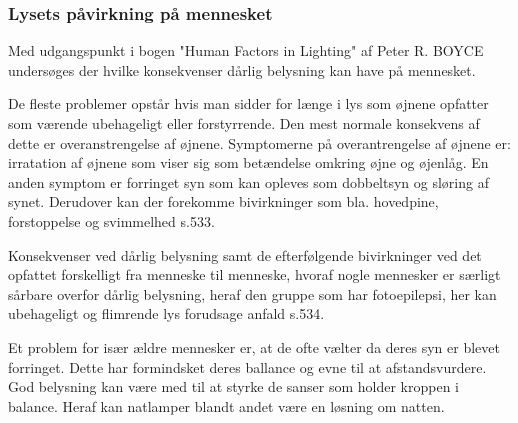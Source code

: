 \subsubsection{Lysets påvirkning på mennesket} 
\label{sec:konsekvenser}

Med udgangspunkt i bogen "Human Factors in Lighting" af Peter R. BOYCE undersøges der hvilke konsekvenser dårlig belysning kan have på mennesket. 

De fleste problemer opstår hvis man sidder for længe i lys som øjnene opfatter som værende ubehageligt eller forstyrrende. Den mest normale konsekvens af dette er overanstrengelse af øjnene. Symptomerne på overantrengelse af øjnene er: irratation af øjnene som viser sig som betændelse omkring øjne og øjenlåg. En anden symptom er forringet syn som kan opleves som dobbeltsyn og sløring af synet. Derudover kan der forekomme bivirkninger som bla. hovedpine, forstoppelse og svimmelhed s.533.

Konsekvenser ved dårlig belysning samt de efterfølgende bivirkninger ved det opfattet forskelligt fra menneske til menneske, hvoraf nogle mennesker er særligt sårbare overfor dårlig belysning, heraf den gruppe som har fotoepilepsi, her kan ubehageligt og flimrende lys forudsage anfald s.534. 

Et problem for især ældre mennesker er, at de ofte vælter da deres syn er blevet forringet. Dette har formindsket deres ballance og evne til at afstandsvurdere. God belysning kan være med til at styrke de sanser som holder kroppen i balance. Heraf kan natlamper blandt andet være en løsning om natten. 
